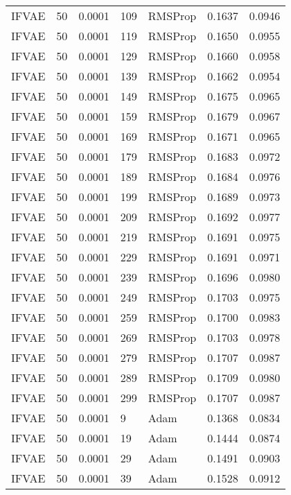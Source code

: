 \begin{tabular}{llrllrr}
 IFVAE &   50 &  0.0001 &   109 &   RMSProp &  0.1637 &       0.0946 \\
 IFVAE &   50 &  0.0001 &   119 &   RMSProp &  0.1650 &       0.0955 \\
 IFVAE &   50 &  0.0001 &   129 &   RMSProp &  0.1660 &       0.0958 \\
 IFVAE &   50 &  0.0001 &   139 &   RMSProp &  0.1662 &       0.0954 \\
 IFVAE &   50 &  0.0001 &   149 &   RMSProp &  0.1675 &       0.0965 \\
 IFVAE &   50 &  0.0001 &   159 &   RMSProp &  0.1679 &       0.0967 \\
 IFVAE &   50 &  0.0001 &   169 &   RMSProp &  0.1671 &       0.0965 \\
 IFVAE &   50 &  0.0001 &   179 &   RMSProp &  0.1683 &       0.0972 \\
 IFVAE &   50 &  0.0001 &   189 &   RMSProp &  0.1684 &       0.0976 \\
 IFVAE &   50 &  0.0001 &   199 &   RMSProp &  0.1689 &       0.0973 \\
 IFVAE &   50 &  0.0001 &   209 &   RMSProp &  0.1692 &       0.0977 \\
 IFVAE &   50 &  0.0001 &   219 &   RMSProp &  0.1691 &       0.0975 \\
 IFVAE &   50 &  0.0001 &   229 &   RMSProp &  0.1691 &       0.0971 \\
 IFVAE &   50 &  0.0001 &   239 &   RMSProp &  0.1696 &       0.0980 \\
 IFVAE &   50 &  0.0001 &   249 &   RMSProp &  0.1703 &       0.0975 \\
 IFVAE &   50 &  0.0001 &   259 &   RMSProp &  0.1700 &       0.0983 \\
 IFVAE &   50 &  0.0001 &   269 &   RMSProp &  0.1703 &       0.0978 \\
 IFVAE &   50 &  0.0001 &   279 &   RMSProp &  0.1707 &       0.0987 \\
 IFVAE &   50 &  0.0001 &   289 &   RMSProp &  0.1709 &       0.0980 \\
 IFVAE &   50 &  0.0001 &   299 &   RMSProp &  0.1707 &       0.0987 \\
 IFVAE &   50 &  0.0001 &     9 &      Adam &  0.1368 &       0.0834 \\
 IFVAE &   50 &  0.0001 &    19 &      Adam &  0.1444 &       0.0874 \\
 IFVAE &   50 &  0.0001 &    29 &      Adam &  0.1491 &       0.0903 \\
 IFVAE &   50 &  0.0001 &    39 &      Adam &  0.1528 &       0.0912 \\

\end{tabular}
